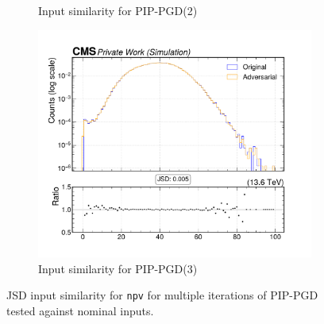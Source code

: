 \begin{figure}[htbp]
\begin{subfigure}[t]{0.32\textwidth}
    \caption*{Input similarity for PIP-PGD(2)}
  \end{subfigure}\hfill
  \begin{subfigure}[t]{0.32\textwidth}
    \includegraphics[width=\linewidth]{media/output/features/compare/combined_it_3/cmp_global_features_npv.pdf}
    \caption*{Input similarity for PIP-PGD(3)}
  \end{subfigure}

  \caption*{JSD input similarity for \texttt{npv} for multiple iterations of PIP-PGD tested against nominal inputs.}
  \label{fig:combined_input_npv}
\end{figure}

